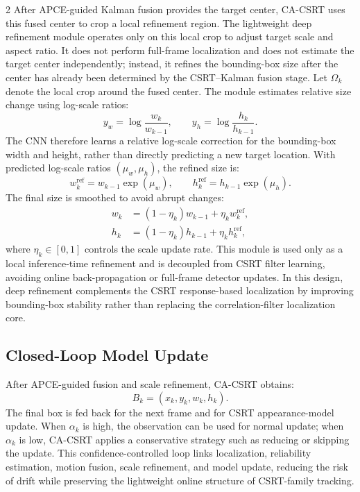 \documentclass[10pt,a4paper]{article}
\begin{document}
\begin{multicols}{2}
After APCE-guided Kalman fusion provides the target center, CA-CSRT uses this fused center to crop a local refinement region. The lightweight deep refinement module operates only on this local crop to adjust target scale and aspect ratio. It does not perform full-frame localization and does not estimate the target center independently; instead, it refines the bounding-box size after the center has already been determined by the CSRT--Kalman fusion stage. Let $\Omega_k$ denote the local crop around the fused center. The module estimates relative size change using log-scale ratios:
\begin{equation}
y_w = \log \frac{w_k}{w_{k-1}}, \qquad
y_h = \log \frac{h_k}{h_{k-1}} .
\end{equation}
The CNN therefore learns a relative log-scale correction for the bounding-box width and height, rather than directly predicting a new target location.
With predicted log-scale ratios $(\mu_w,\mu_h)$, the refined size is:
\begin{equation}
w_k^{\mathrm{ref}} = w_{k-1}\exp(\mu_w), \qquad
h_k^{\mathrm{ref}} = h_{k-1}\exp(\mu_h).
\end{equation}
The final size is smoothed to avoid abrupt changes:
\begin{equation}
\begin{aligned}
w_k &= (1-\eta_k)w_{k-1} + \eta_k w_k^{\mathrm{ref}},\\
h_k &= (1-\eta_k)h_{k-1} + \eta_k h_k^{\mathrm{ref}},
\end{aligned}
\end{equation}
where $\eta_k \in [0,1]$ controls the scale update rate. This module is used only as a local inference-time refinement and is decoupled from CSRT filter learning, avoiding online back-propagation or full-frame detector updates. In this design, deep refinement complements the CSRT response-based localization by improving bounding-box stability rather than replacing the correlation-filter localization core.

\subsection{Closed-Loop Model Update}

After APCE-guided fusion and scale refinement, CA-CSRT obtains:
\begin{equation}
B_k = (x_k,y_k,w_k,h_k).
\end{equation}
The final box is fed back for the next frame and for CSRT appearance-model update. When $\alpha_k$ is high, the observation can be used for normal update; when $\alpha_k$ is low, CA-CSRT applies a conservative strategy such as reducing or skipping the update. This confidence-controlled loop links localization, reliability estimation, motion fusion, scale refinement, and model update, reducing the risk of drift while preserving the lightweight online structure of CSRT-family tracking.


\end{multicols}
\end{document}
